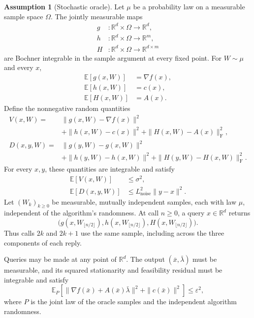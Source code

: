 \documentclass[10pt]{article}
\theoremstyle{definition}
\newtheorem{assumption}{Assumption}
\begin{document}
\begin{assumption}[Stochastic oracle]
Let $\mu$ be a probability law on a measurable sample space $\Omega$. The jointly measurable maps
\[
\begin{aligned}
g &: \mathbb{R}^d\times\Omega\to\mathbb{R}^d,\\
h &: \mathbb{R}^d\times\Omega\to\mathbb{R}^m,\\
H &: \mathbb{R}^d\times\Omega\to\mathbb{R}^{d\times m}
\end{aligned}
\]
are Bochner integrable in the sample argument at every fixed point. For $W\sim\mu$ and every $x$,
\[
\begin{aligned}
\mathbb{E}[g(x,W)]&=\nabla f(x),\\
\mathbb{E}[h(x,W)]&=c(x),\\
\mathbb{E}[H(x,W)]&=A(x).
\end{aligned}
\]
Define the nonnegative random quantities
\[
\begin{aligned}
V(x,W)={}&\|g(x,W)-\nabla f(x)\|^2\\
&+\|h(x,W)-c(x)\|^2
+\|H(x,W)-A(x)\|_{\mathrm F}^2,\\
D(x,y,W)={}&\|g(y,W)-g(x,W)\|^2\\
&+\|h(y,W)-h(x,W)\|^2
+\|H(y,W)-H(x,W)\|_{\mathrm F}^2.
\end{aligned}
\]
For every $x,y$, these quantities are integrable and satisfy
\[
\begin{aligned}
\mathbb{E}[V(x,W)]&\leq\sigma^2,\\
\mathbb{E}[D(x,y,W)]&\leq L_{\mathrm{noise}}^2\|y-x\|^2.
\end{aligned}
\]
Let $(W_k)_{k\geq0}$ be measurable, mutually independent samples, each with law $\mu$, independent of the algorithm's randomness. At call $n\geq0$, a query $x\in\mathbb{R}^d$ returns
\[
\bigl(g(x,W_{\lfloor n/2\rfloor}),
 h(x,W_{\lfloor n/2\rfloor}),
 H(x,W_{\lfloor n/2\rfloor})\bigr).
\]
Thus calls $2k$ and $2k+1$ use the same sample, including across the three components of each reply.
\end{assumption}

Queries may be made at any point of $\mathbb{R}^d$. The output $(\bar{x},\bar{\lambda})$ must be measurable, and its squared stationarity and feasibility residual must be integrable and satisfy
\[
\mathbb{E}_{P}\!\left[
\|\nabla f(\bar{x})+A(\bar{x})\bar{\lambda}\|^2
+\|c(\bar{x})\|^2
\right]\leq\varepsilon^2,
\]
where $P$ is the joint law of the oracle samples and the independent algorithm randomness.
\end{document}
